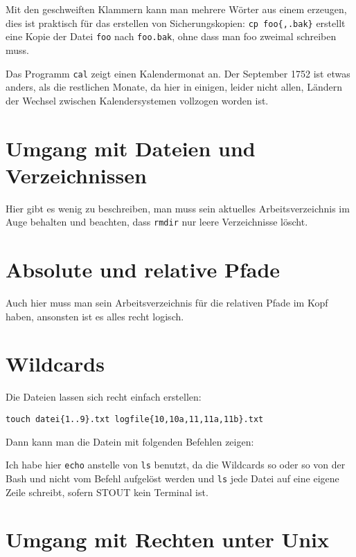 \documentclass[12pt]{report}
\begin{document}
Mit den geschweiften Klammern kann man mehrere Wörter aus einem erzeugen, dies ist praktisch für das erstellen von Sicherungskopien: \verb#cp foo{,.bak}# erstellt eine Kopie der Datei \texttt{foo} nach \texttt{foo.bak}, ohne dass man foo zweimal schreiben muss.

Das Programm \texttt{cal} zeigt einen Kalendermonat an. Der September 1752 ist etwas anders, als die restlichen Monate, da hier in einigen, leider nicht allen, Ländern der Wechsel zwischen Kalendersystemen vollzogen worden ist.

\section{Umgang mit Dateien und Verzeichnissen}

Hier gibt es wenig zu beschreiben, man muss sein aktuelles Arbeitsverzeichnis im Auge behalten und beachten, dass \texttt{rmdir} nur leere Verzeichnisse löscht.

\section{Absolute und relative Pfade}

Auch hier muss man sein Arbeitsverzeichnis für die relativen Pfade im Kopf haben, ansonsten ist es alles recht logisch.

\section{Wildcards}

Die Dateien lassen sich recht einfach erstellen:
\begin{lstlisting}[caption=Anlegen der Dateien]
touch datei{1..9}.txt logfile{10,10a,11,11a,11b}.txt
\end{lstlisting}

Dann kann man die Datein mit folgenden Befehlen zeigen:



Ich habe hier \texttt{echo} anstelle von \texttt{ls} benutzt, da die Wildcards so oder so von der Bash und nicht vom Befehl aufgelöst werden und \texttt{ls} jede Datei auf eine eigene Zeile schreibt, sofern STOUT kein Terminal ist.

\section{Umgang mit Rechten unter Unix}
\end{document}
